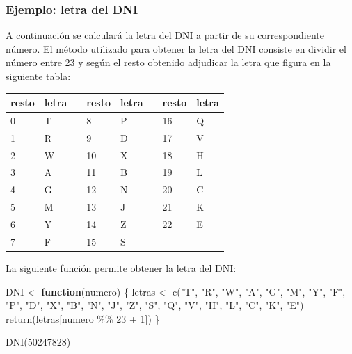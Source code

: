 \documentclass[
]{book}
\newenvironment{Shaded}{\begin{snugshade}}{\end{snugshade}}
\newcommand{\ControlFlowTok}[1]{\textcolor[rgb]{0.13,0.29,0.53}{\textbf{#1}}}
\newcommand{\DecValTok}[1]{\textcolor[rgb]{0.00,0.00,0.81}{#1}}
\newcommand{\FunctionTok}[1]{\textcolor[rgb]{0.00,0.00,0.00}{#1}}
\newcommand{\NormalTok}[1]{#1}
\newcommand{\OtherTok}[1]{\textcolor[rgb]{0.56,0.35,0.01}{#1}}
\newcommand{\SpecialCharTok}[1]{\textcolor[rgb]{0.00,0.00,0.00}{#1}}
\newcommand{\StringTok}[1]{\textcolor[rgb]{0.31,0.60,0.02}{#1}}
\theoremstyle{break}
\begin{document}
\hypertarget{ejemplo-letra-del-dni}{%
\subsubsection{Ejemplo: letra del DNI}\label{ejemplo-letra-del-dni}}

A continuación se
calculará la letra del DNI a partir de su correspondiente número. El
método utilizado para obtener la letra del DNI consiste en dividir el
número entre 23 y según el resto obtenido adjudicar la letra que figura
en la siguiente tabla:

\begin{longtable}[]{@{}llllllll@{}}
\toprule
resto & letra & & resto & letra & & resto & letra \\
\midrule
\endhead
0 & T & & 8 & P & & 16 & Q \\
1 & R & & 9 & D & & 17 & V \\
2 & W & & 10 & X & & 18 & H \\
3 & A & & 11 & B & & 19 & L \\
4 & G & & 12 & N & & 20 & C \\
5 & M & & 13 & J & & 21 & K \\
6 & Y & & 14 & Z & & 22 & E \\
7 & F & & 15 & S & & & \\
\bottomrule
\end{longtable}

La siguiente función permite obtener la letra del DNI:

\begin{Shaded}
\begin{Highlighting}[]
\NormalTok{DNI }\OtherTok{\textless{}{-}} \ControlFlowTok{function}\NormalTok{(numero) \{}
\NormalTok{  letras }\OtherTok{\textless{}{-}} \FunctionTok{c}\NormalTok{(}\StringTok{"T"}\NormalTok{, }\StringTok{"R"}\NormalTok{, }\StringTok{"W"}\NormalTok{, }\StringTok{"A"}\NormalTok{, }\StringTok{"G"}\NormalTok{, }\StringTok{"M"}\NormalTok{, }\StringTok{"Y"}\NormalTok{, }\StringTok{"F"}\NormalTok{, }
              \StringTok{"P"}\NormalTok{, }\StringTok{"D"}\NormalTok{, }\StringTok{"X"}\NormalTok{, }\StringTok{"B"}\NormalTok{, }\StringTok{"N"}\NormalTok{, }\StringTok{"J"}\NormalTok{, }\StringTok{"Z"}\NormalTok{, }\StringTok{"S"}\NormalTok{, }
              \StringTok{"Q"}\NormalTok{, }\StringTok{"V"}\NormalTok{, }\StringTok{"H"}\NormalTok{, }\StringTok{"L"}\NormalTok{, }\StringTok{"C"}\NormalTok{, }\StringTok{"K"}\NormalTok{, }\StringTok{"E"}\NormalTok{)}
  \FunctionTok{return}\NormalTok{(letras[numero }\SpecialCharTok{\%\%} \DecValTok{23} \SpecialCharTok{+} \DecValTok{1}\NormalTok{]) }
\NormalTok{\}}

\FunctionTok{DNI}\NormalTok{(}\DecValTok{50247828}\NormalTok{)}
\end{Highlighting}
\end{Shaded}
\end{document}
